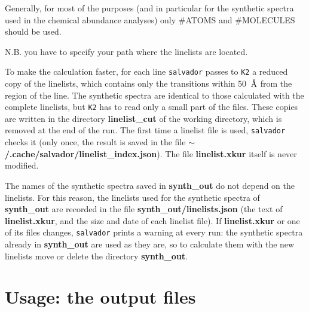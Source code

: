 \documentclass[modern]{aastex701}
\newcommand{\angstrom}{\mbox{\normalfont\AA}}
\begin{document}
Generally, for most of the purposes (and in particular for the synthetic spectra used in the chemical abundance analyses) only \#ATOMS and \#MOLECULES should be used. 

N.B. you have to specify your path where the linelists are located.

To make the calculation faster, for each line \texttt{salvador} passes to \texttt{K2} a reduced copy of the linelists, which contains only the transitions within 50~$\angstrom$ from the region of the line. The synthetic spectra are identical to those calculated with the complete linelists, but \texttt{K2} has to read only a small part of the files. These copies are written in the directory {\bf linelist\_cut} of the working directory, which is removed at the end of the run. The first time a linelist file is used, \texttt{salvador} checks it (only once, the result is saved in the file {\bf $\sim$/.cache/salvador/linelist\_index.json}). The file {\bf linelist.xkur} itself is never modified.

The names of the synthetic spectra saved in {\bf synth\_out} do not depend on the linelists. For this reason, the linelists used for the synthetic spectra of {\bf synth\_out} are recorded in the file {\bf synth\_out/linelists.json} (the text of {\bf linelist.xkur}, and the size and date of each linelist file). If {\bf linelist.xkur} or one of its files changes, \texttt{salvador} prints a warning at every run: the synthetic spectra already in {\bf synth\_out} are used as they are, so to calculate them with the new linelists move or delete the directory {\bf synth\_out}.


\section{Usage: the output files} \label{sect:output_files}
\hrulefill
\end{document}
